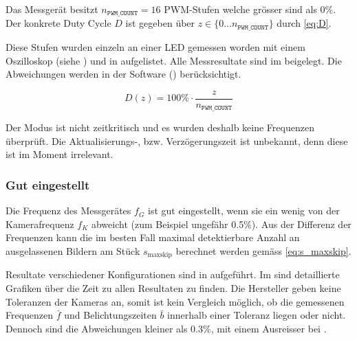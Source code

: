 \noindent\begin{minipage}[t]{.47\linewidth}\vspace{0pt}

    Das Messgerät besitzt $n_\texttt{PWM\_COUNT}=16$ PWM-Stufen welche grösser sind als 0\%.
    Der konkrete Duty Cycle $D$ ist gegeben über $z\in\{0\ldots n_\texttt{PWM\_COUNT}\}$ durch \eqref{eq:D}.

    Diese Stufen wurden einzeln an einer LED gemessen worden mit einem Oszilloskop (siehe ) und in  aufgelistet.
    Alle Messresultate sind im  beigelegt.
    Die Abweichungen werden in der Software () berücksichtigt.

    \begin{equation}\label{eq:D}
        D(z) = 100\%\cdot\frac{z}{n_\texttt{PWM\_COUNT}}
    \end{equation}

\end{minipage}


Der  Modus ist nicht zeitkritisch und es wurden deshalb keine Frequenzen überprüft.
Die Aktualisierungs-, bzw. Verzögerungszeit ist unbekannt, denn diese ist im Moment irrelevant.

\subsubsection{Gut eingestellt}\label{sec:Gut-Eingestellt}

Die Frequenz des Messgerätes $f_G$ ist gut eingestellt, wenn sie ein wenig von der Kamerafrequenz $f_K$ abweicht (zum Beispiel ungefähr 0.5\%).
Aus der Differenz der Frequenzen kann die im besten Fall maximal detektierbare Anzahl an ausgelassenen Bildern am Stück $s_\text{maxskip}$ berechnet werden gemäss \eqref{eq:s_maxskip}.

Resultate verschiedener Konfigurationen sind in  aufgeführt.
Im  sind detaillierte Grafiken über die Zeit zu allen Resultaten zu finden.
Die Hersteller \cite{ids,aos} geben keine Toleranzen der Kameras an, somit ist kein Vergleich möglich, ob die gemessenen Frequenzen $\bar f$ und Belichtungszeiten $\bar b$ innerhalb einer Toleranz liegen oder nicht.
Dennoch sind die Abweichungen kleiner als 0.3\%, mit einem Ausreisser bei .

